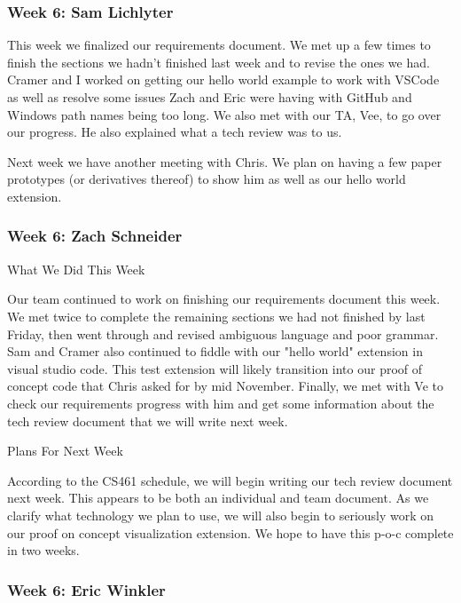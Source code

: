  

 \subsubsection{Week 6: Sam Lichlyter}

This week we finalized our requirements document. We met up a few times to finish the sections we hadn't finished last week and to revise the ones we had. Cramer and I worked on getting our hello world example to work with VSCode as well as resolve some issues Zach and Eric were having with GitHub and Windows path names being too long. We also met with our TA, Vee, to go over our progress. He also explained what a tech review was to us.



Next week we have another meeting with Chris. We plan on having a few paper prototypes (or derivatives thereof) to show him as well as our hello world extension. \\ 

 \subsubsection{Week 6: Zach Schneider}

What We Did This Week

Our team continued to work on finishing our requirements document this week. We met twice to complete the remaining sections we had not finished by last Friday, then went through and revised ambiguous language and poor grammar. Sam and Cramer also continued to fiddle with our "hello world" extension in visual studio code. This test extension will likely transition into our proof of concept code that Chris asked for by mid November. Finally, we met with Ve to check our requirements progress with him and get some information about the tech review document that we will write next week.



Plans For Next Week

According to the CS461 schedule, we will begin writing our tech review document next week. This appears to be both an individual and team document. As we clarify what technology we plan to use, we will also begin to seriously work on our proof on concept visualization extension. We hope to have this p-o-c complete in two weeks. \\ 

 \subsubsection{Week 6: Eric Winkler}

